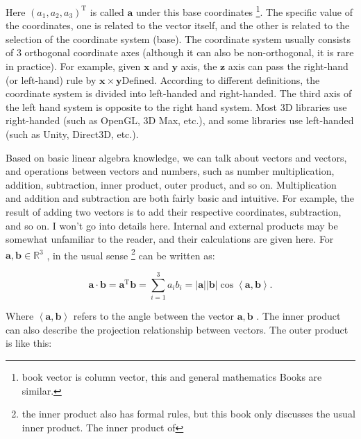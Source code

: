 Here $ (a_ 1 , a_ 2 , a_ 3 )^ \mathrm {T} $ is called $ \bm {a} $ under this base coordinates \footnote {book vector is column vector, this and general mathematics Books are similar. }. The specific value of the coordinates, one is related to the vector itself, and the other is related to the selection of the coordinate system (base). The coordinate system usually consists of 3 orthogonal coordinate axes (although it can also be non-orthogonal, it is rare in practice). For example, given $ \bm {x} $ and $ \bm {y} $ axis, the $ \bm {z} $ axis can pass the right-hand (or left-hand) rule by $ \bm {x} \times  \bm {y} $Defined. According to different definitions, the coordinate system is divided into left-handed and right-handed. The third axis of the left hand system is opposite to the right hand system. Most 3D libraries use right-handed (such as OpenGL, 3D Max, etc.), and some libraries use left-handed (such as Unity, Direct3D, etc.).

Based on basic linear algebra knowledge, we can talk about vectors and vectors, and operations between vectors and numbers, such as number multiplication, addition, subtraction, inner product, outer product, and so on. Multiplication and addition and subtraction are both fairly basic and intuitive. For example, the result of adding two vectors is to add their respective coordinates, subtraction, and so on. I won't go into details here. Internal and external products may be somewhat unfamiliar to the reader, and their calculations are given here. For $ \bm {a}, \bm {b} \in  \mathbb {R}^ 3 $ , in the usual sense \footnote {the inner product also has formal rules, but this book only discusses the usual inner product. The inner product of } can be written as:

\begin{equation}
\bm{a} \cdot \bm{b} = { \bm{a}^\mathrm{T}}\bm{b} = \sum\limits_{i = 1}^3 {{a_i}{b_i}}  = \left| \bm{a} \right|\left| \bm{b} \right|\cos \left\langle {\bm{a},\bm{b}} \right\rangle .
\end{equation}

Where $ \left \langle { \bm {a}, \bm {b}} \right \rangle $ refers to the angle between the vector $ \bm {a}, \bm {b} $ . The inner product can also describe the projection relationship between vectors. The outer product is like this:

